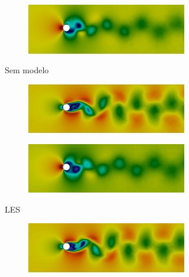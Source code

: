 \begin{figure}[h!]
\begin{subfigure}{\textwidth}
        \begin{subfigure}{.49\textwidth}
            \includegraphics[width=\linewidth]{Figuras/cylinder/analise2/none-Qua-p.png}
        \end{subfigure}
        \caption{Sem modelo}
    \end{subfigure}
    \begin{subfigure}{\textwidth}\centering
        \begin{subfigure}{.49\textwidth}
            \includegraphics[width=\linewidth]{Figuras/cylinder/analise2/LES-Qua-u.png}
        \end{subfigure}
        \begin{subfigure}{.49\textwidth}
            \includegraphics[width=\linewidth]{Figuras/cylinder/analise2/LES-Qua-p.png}
        \end{subfigure}
        \caption{LES}
    \end{subfigure}
    \begin{subfigure}{\textwidth}\centering
        \begin{subfigure}{.49\textwidth}
            \includegraphics[width=\linewidth]{Figuras/cylinder/analise2/VMS-Qua-u.png}

\end{subfigure}
\end{subfigure}
\end{figure}
